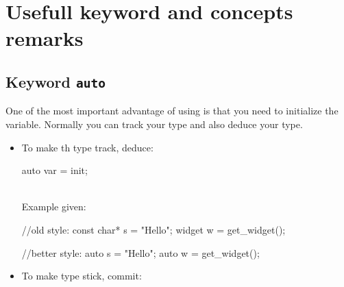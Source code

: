 \section{Usefull keyword and concepts remarks}
\label{sec:Useufull-keyword-remarks}
\subsection{Keyword \texttt{auto}}
\label{subsec:Keyword auto}
One of the most important advantage of using is that you need to initialize the variable. Normally you can track your type and also deduce your type. 
\begin{itemize}
    \item To make th type track, deduce:\\
    \begin{minipage}{\MPWxXXSxLISTING\textwidth} %
        \begin{CPPCode}
auto var = init;
        \end{CPPCode}
    \end{minipage}\\ 
    Example given:\\
\begin{minipage}{\MPWxXXSxLISTING\textwidth} %
{} %
        \begin{CPPCode}
//old style:
const char* s = "Hello";
widget w = get_widget();
        \end{CPPCode}
    \end{minipage}
    \begin{minipage}{\MPWxXXSxLISTING\textwidth} %
        \begin{CPPCode}
//better style:
auto s = "Hello";
auto w = get_widget();
        \end{CPPCode}
    \end{minipage}
    \item To make type stick, commit:\\
    \begin{minipage}{\MPWxXXSxLISTING\textwidth} %

\end{minipage}
\end{itemize}
